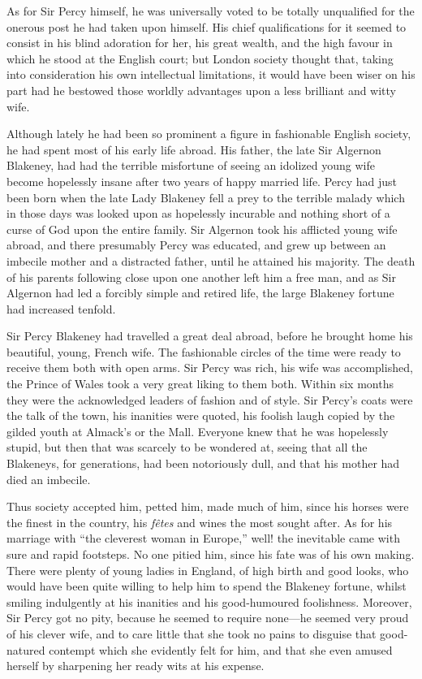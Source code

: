 \documentclass[paper=a5,BCOR=7mm,twoside,DIV=calc,12pt,usegeometry,chapterprefix,endperiod,headings=big]{scrbook}
\begin{document}
As for Sir Percy himself, he was universally voted to be totally unqualified for the onerous post he had taken upon himself. His chief qualifications for it seemed to consist in his blind adoration for her, his great wealth, and the high favour in which he stood at the English court; but London society thought that, taking into consideration his own intellectual limitations, it would have been wiser on his part had he bestowed those worldly advantages upon a less brilliant and witty wife.

Although lately he had been so prominent a figure in fashionable English society, he had spent most of his early life abroad. His father, the late Sir Algernon Blakeney, had had the terrible misfortune of seeing an idolized young wife become hopelessly insane after two years of happy married life. Percy had just been born when the late Lady Blakeney fell a prey to the terrible malady which in those days was looked upon as hopelessly incurable and nothing short of a curse of God upon the entire family. Sir Algernon took his afflicted young wife abroad, and there presumably Percy was educated, and grew up between an imbecile mother and a distracted father, until he attained his majority. The death of his parents following close upon one another left him a free man, and as Sir Algernon had led a forcibly simple and retired life, the large Blakeney fortune had increased tenfold.

Sir Percy Blakeney had travelled a great deal abroad, before he brought home his beautiful, young, French wife. The fashionable circles of the time were ready to receive them both with open arms. Sir Percy was rich, his wife was accomplished, the Prince of Wales took a very great liking to them both. Within six months they were the acknowledged leaders of fashion and of style. Sir Percy's coats were the talk of the town, his inanities were quoted, his foolish laugh copied by the gilded youth at Almack's or the Mall. Everyone knew that he was hopelessly stupid, but then that was scarcely to be wondered at, seeing that all the Blakeneys, for generations, had been notoriously dull, and that his mother had died an imbecile.

Thus society accepted him, petted him, made much of him, since his horses were the finest in the country, his \textit{fêtes} and wines the most sought after. As for his marriage with \enquote{the cleverest woman in Europe,} well! the inevitable came with sure and rapid footsteps. No one pitied him, since his fate was of his own making. There were plenty of young ladies in England, of high birth and good looks, who would have been quite willing to help him to spend the Blakeney fortune, whilst smiling indulgently at his inanities and his good-humoured foolishness. Moreover, Sir Percy got no pity, because he seemed to require none---he seemed very proud of his clever wife, and to care little that she took no pains to disguise that good-natured contempt which she evidently felt for him, and that she even amused herself by sharpening her ready wits at his expense.
\end{document}

